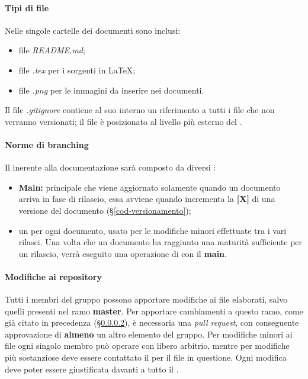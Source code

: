 \paragraph{Tipi di file}
Nelle singole cartelle dei documenti sono inclusi:
\begin{itemize}
\item file \textit{README.md};
\item file \textit{.tex} per i sorgenti in \LaTeX; 
\item file \textit{.png} per le immagini da inserire nei documenti.
\end{itemize}
Il file \textit{.gitignore} contiene al suo interno un riferimento a tutti i file che non verranno versionati; il file è posizionato al livello più esterno del .
\paragraph{Norme di branching}
\label{NormeBranching}
Il  inerente alla documentazione sarà composto da diversi :
\begin{itemize}
	\item \textbf{Main:}  principale che viene aggiornato solamente quando un documento arriva in fase di rilascio, essa avviene quando incrementa la \textbf{[X]} di una versione del documento (\S{}\ref{cod-versionamento});
	\item un  per ogni documento, usato per le modifiche minori effettuate tra i vari rilasci. Una volta che un documento ha raggiunto una maturità sufficiente per un rilascio, verrà eseguito una operazione di  con il \textbf{main}.
\end{itemize}
\paragraph{Modifiche ai repository}
Tutti i membri del gruppo possono apportare modifiche ai file elaborati, salvo quelli presenti nel ramo \textbf{master}. Per apportare cambiamenti a questo ramo, come già citato in precedenza (\S{}\ref{NormeBranching}), è necessaria una \textit{pull request}, con conseguente approvazione di \textbf{almeno} un altro elemento del gruppo.\newline
Per modifiche minori ai file ogni singolo membro può operare con libero arbitrio, mentre per modifiche più sostanziose deve essere contattato il \RdP{} per il file in questione.\newline
Ogni modifica deve poter essere giustificata davanti a tutto il .
